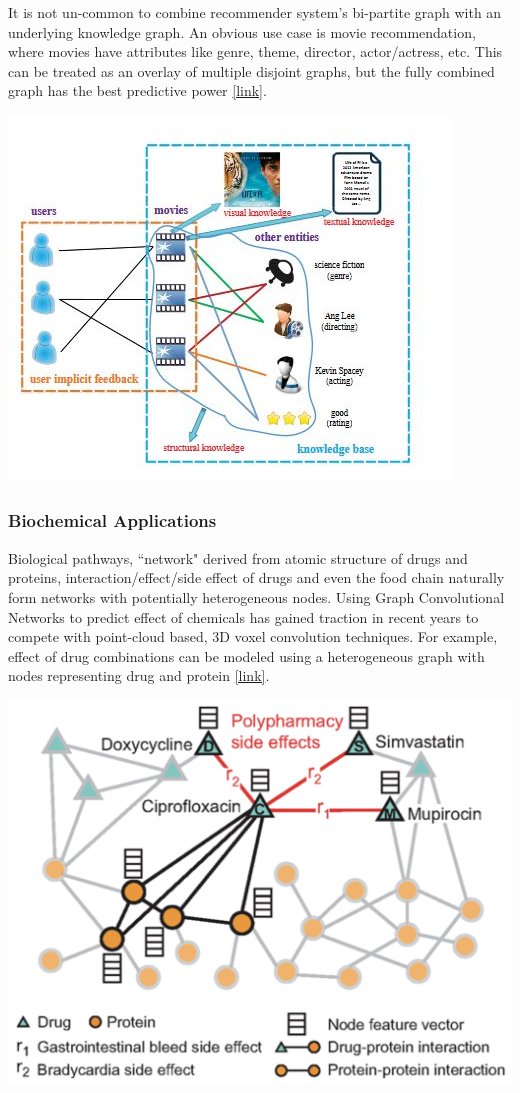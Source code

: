 It is not un-common to combine recommender system's bi-partite graph with an underlying knowledge graph. An obvious use case is movie recommendation, where movies have attributes like genre, theme, director, actor/actress, etc. This can be treated as an overlay of multiple disjoint graphs, but the fully combined graph has the best predictive power \href{https://www.kdd.org/kdd2016/papers/files/adf0066-zhangA.pdf}{[link]}.

{
\centering
\includegraphics[width=0.5\linewidth]{img/n1_movies.jpg}\par
}


\subsubsection{Biochemical Applications}

Biological pathways, ``network" derived from atomic structure of drugs and proteins, interaction/effect/side effect of drugs and even the food chain naturally form networks with potentially heterogeneous nodes. Using Graph Convolutional Networks \label{??} to predict effect of chemicals has gained traction in recent years to compete with point-cloud based, 3D voxel convolution techniques. For example, effect of drug combinations can be modeled using a heterogeneous graph with nodes representing drug and protein \href{https://www.kurzweilai.net/how-to-predict-the-side-effects-of-millions-of-drug-combinations}{[link]}.

{
\centering
\includegraphics[width=0.5\linewidth]{img/n1_drug.png}\par
}